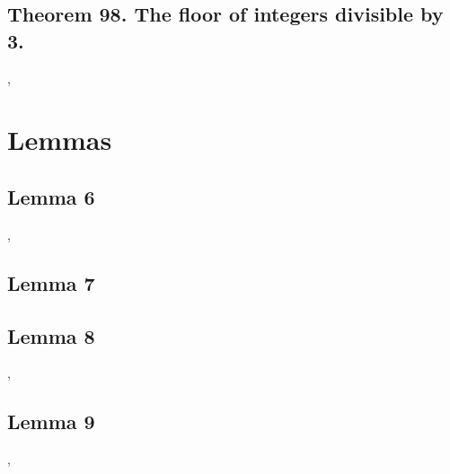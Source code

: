 \documentclass[preview]{standalone}
\begin{document}
\subsection[The floor of integers divisible by 3.]
    {
        \color{section}Theorem 98. \color{black} The floor of integers divisible by 3.
    }

\sep
\pagebreak


\section{Lemmas}
\subsection[Lemma 6]{\color{section}Lemma 6}

\sep


\subsection[Lemma 7]{\color{section}Lemma 7}

\pagebreak


\subsection[Lemma 8]{\color{section}Lemma 8}

\sep


\subsection[Lemma 9]{\color{section}Lemma 9}

\sep
\end{document}
